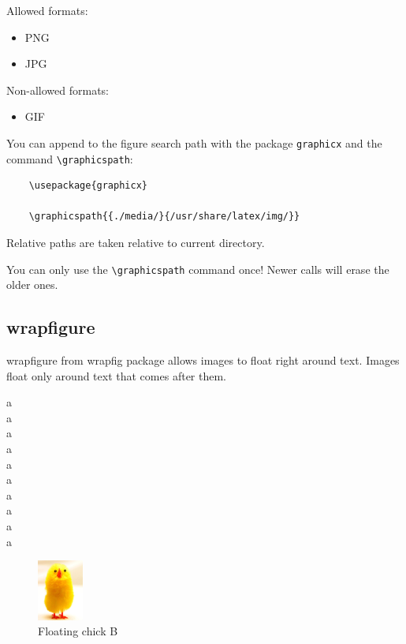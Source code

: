 \documentclass[12pt]{article}
\begin{document}
  Allowed formats:

  \begin{itemize}
    \item PNG
    \item JPG
  \end{itemize}

  Non-allowed formats:

  \begin{itemize}
    \item GIF
  \end{itemize}

  You can append to the figure search path with the package \lstinline|graphicx| and the command \lstinline|\graphicspath|:

  \begin{lstlisting}
    \usepackage{graphicx}

    \graphicspath{{./media/}{/usr/share/latex/img/}}
  \end{lstlisting}

  Relative paths are taken relative to current directory.

  You can only use the \lstinline|\graphicspath| command once! Newer calls will erase the older ones.

%

  \subsection{wrapfigure}\label{wrapfigure}%

    wrapfigure from wrapfig package allows images to float right around text.
    Images float only around text that comes after them.

    a \\ a \\ a \\ a\\ a \\ a \\ a \\ a \\ a\\ a \\

    \begin{figure}
      \includegraphics[height=2cm]{image.png}
      \caption{Floating chick B}
    \end{figure}
\end{document}
